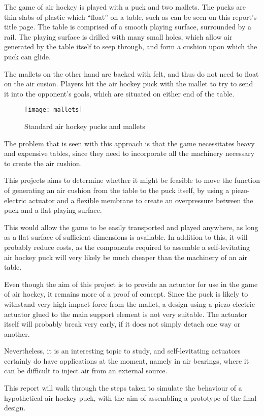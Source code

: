 The game of air hockey is played with a puck and two mallets. The pucks are
thin slabs of plastic which ``float'' on a table, such as can be seen on this
report's title page. The table is comprised of a smooth playing surface,
surrounded by a rail. The playing surface is drilled with many small holes,
which allow air generated by the table itself to seep through, and form a
cushion upon which the puck can glide.

The mallets on the other hand are backed with felt, and thus do not need to
float on the air cusion. Players hit the air hockey puck with the mallet to try
to send it into the opponent's goals, which are situated on either end of the
table.

\begin{figure}[h]
  \begin{center}
    \texttt{[image: mallets]}
  \end{center}
  \caption{Standard air hockey pucks and mallets}
  \label{fig:mallets}
\end{figure}

The problem that is seen with this approach is that the game necessitates heavy
and expensive tables, since they need to incorporate all the machinery necessary
to create the air cushion.

This projects aims to determine whether it might be feasible to move the
function of generating an air cushion from the table to the puck itself, by
using a piezo-electric actuator and a flexible membrane to create an
overpressure between the puck and a flat playing surface.

This would allow the game to be easily transported and played anywhere, as long
as a flat surface of sufficient dimensions is available. In addition to this, it
will probably reduce costs, as the components required to assemble a
self-levitating air hockey puck will very likely be much cheaper than the
machinery of an air table.

\asterbreak

Even though the aim of this project is to provide an actuator for use in the
game of air hockey, it remains more of a proof of concept. Since the puck is
likely to withstand very high impact force from the mallet, a design using a
piezo-electric actuator glued to the main support element is not very suitable.
The actuator itself will probably break very early, if it does not simply detach
one way or another.

Nevertheless, it is an interesting topic to study, and self-levitating actuators
certainly do have applications at the moment, namely in air bearings, where it
can be difficult to inject air from an external source.

This report will walk through the steps taken to simulate the behaviour of a
hypothetical air hockey puck, with the aim of assembling a prototype of the
final design.
